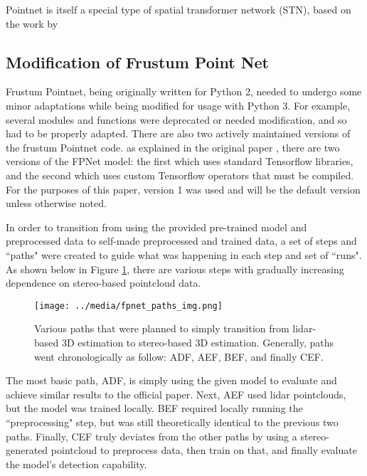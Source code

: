 Pointnet is itself a special type of spatial transformer network (STN), based on the work by 




\subsection{Modification of Frustum Point Net}
Frustum Pointnet, being originally written for Python 2, needed to undergo some minor adaptations while being modified for usage with Python 3. For example, several modules and functions were deprecated or needed modification, and so had to be properly adapted. There are also two actively maintained versions of the frustum Pointnet code. as explained in the original paper \cite{qi_frustum_2017}, there are two versions of the FPNet model: the first which uses standard Tensorflow libraries, and the second which uses custom Tensorflow operators that must be compiled. For the purposes of this paper, version 1 was used and will be the default version unless otherwise noted.

In order to transition from using the provided pre-trained model and preprocessed data to self-made preprocessed and trained data, a set of steps and ``paths" were created to guide what was happening in each step and set of ``runs". As shown below in Figure \ref{fp_paths}, there are various steps with gradually increasing dependence on stereo-based pointcloud data.

\begin{figure}[H]
    \centering
    \texttt{[image: ../media/fpnet\_paths\_img.png]}
    \caption{Various paths that were planned to simply transition from lidar-based 3D estimation to stereo-based 3D estimation. Generally, paths went chronologically as follow: ADF, AEF, BEF, and finally CEF.}
    \label{fp_paths}
\end{figure}

The most basic path, ADF, is simply using the given model to evaluate and achieve similar results to the official paper. Next, AEF used lidar pointclouds, but the model was trained locally. BEF required locally running the ``preprocessing" step, but was still theoretically identical to the previous two paths. Finally, CEF truly deviates from the other paths by using a stereo-generated pointcloud to preprocess data, then train on that, and finally evaluate the model's detection capability.





